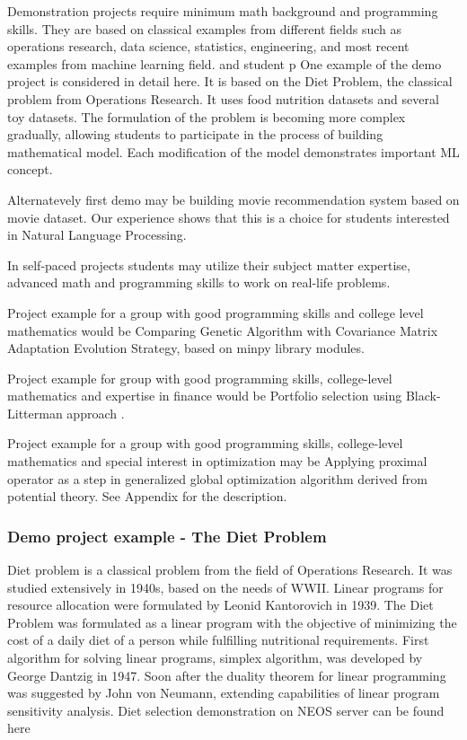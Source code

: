 \documentclass{article} %
\begin{document}
Demonstration projects require minimum math background and programming skills. They are based on classical examples from different fields such as operations research, data science, statistics, engineering, and most recent examples from machine learning field. and student p
One example of the demo project is considered in detail here. It is based on the Diet Problem, the classical problem from Operations Research. It uses food nutrition datasets  and several toy datasets. The formulation of the problem is becoming more complex gradually, allowing students to participate in the process of building mathematical model. Each modification of the model demonstrates important  ML concept.

Alternatevely first demo may be building movie recommendation system  based on movie dataset. Our experience shows that this is a choice for students interested in Natural Language Processing. 


In self-paced projects students may utilize their subject matter expertise, advanced math and programming skills to work on real-life problems. 

Project example for a group with good programming skills and  college level mathematics would be Comparing Genetic Algorithm with Covariance Matrix Adaptation Evolution Strategy, based on minpy library modules.

Project example for group with good programming skills, college-level mathematics and expertise in finance would be Portfolio selection using Black-Litterman approach \cite{ZK}. 

Project example for a group with good programming skills, college-level mathematics  and special interest in optimization may be Applying proximal operator as a step in generalized global optimization algorithm derived from potential theory. See Appendix for the description.


\subsubsection{Demo project  example - The Diet Problem}
Diet problem is a classical problem from the field of Operations Research.  It was studied extensively in 1940s, based on the needs of WWII. Linear programs for resource allocation were formulated by Leonid Kantorovich in 1939. The Diet Problem was formulated as a linear program with the objective of minimizing the cost of a daily diet of a person while fulfilling nutritional requirements. First algorithm for solving linear programs, simplex algorithm, was developed by George Dantzig in 1947. Soon after the duality theorem for linear programming was suggested by John von Neumann, extending capabilities of linear program sensitivity analysis. 
Diet selection demonstration on NEOS server can be found here \cite{neos}
\end{document}
